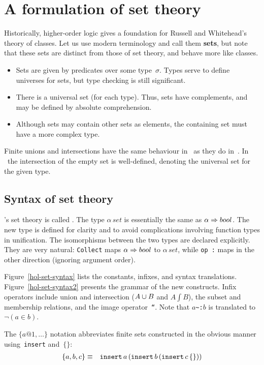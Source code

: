 \section{A formulation of set theory}
Historically, higher-order logic gives a foundation for Russell and
Whitehead's theory of classes.  Let us use modern terminology and call them
{\bf sets}, but note that these sets are distinct from those of {\ZF} set
theory, and behave more like {\ZF} classes.
\begin{itemize}
\item
Sets are given by predicates over some type~$\sigma$.  Types serve to
define universes for sets, but type checking is still significant.
\item
There is a universal set (for each type).  Thus, sets have complements, and
may be defined by absolute comprehension.
\item
Although sets may contain other sets as elements, the containing set must
have a more complex type.
\end{itemize}
Finite unions and intersections have the same behaviour in \HOL\ as they
do in~{\ZF}.  In \HOL\ the intersection of the empty set is well-defined,
denoting the universal set for the given type.

\subsection{Syntax of set theory}
\HOL's set theory is called .  The type $\alpha\,set$ is
essentially the same as $\alpha\Rightarrow bool$.  The new type is defined for
clarity and to avoid complications involving function types in unification.
The isomorphisms between the two types are declared explicitly.  They are
very natural: \texttt{Collect} maps $\alpha\Rightarrow bool$ to $\alpha\,set$, while
\hbox{\tt op :} maps in the other direction (ignoring argument order).

Figure~\ref{hol-set-syntax} lists the constants, infixes, and syntax
translations.  Figure~\ref{hol-set-syntax2} presents the grammar of the new
constructs.  Infix operators include union and intersection ($A\cup B$
and $A\int B$), the subset and membership relations, and the image
operator~{\tt``}\@.  Note that $a$\verb|~:|$b$ is translated to
$\neg(a\in b)$.  

The $\{a@1,\ldots\}$ notation abbreviates finite sets constructed in
the obvious manner using~{\tt insert} and~$\{\}$:
\begin{eqnarray*}
  \{a, b, c\} & \equiv &
  \texttt{insert} \, a \, ({\tt insert} \, b \, ({\tt insert} \, c \, \{\}))
\end{eqnarray*}

